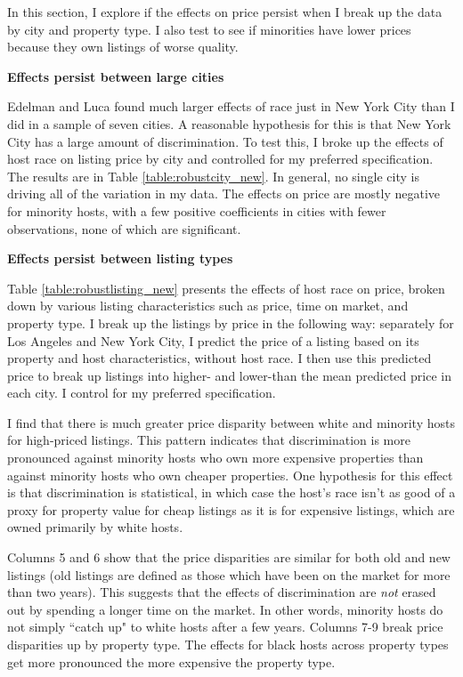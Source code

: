
In this section, I explore if the effects on price persist when I break up the data by city and property type. I also test to see if minorities have lower prices because they own listings of worse quality. 

\textbf{Effects persist between large cities}

Edelman and Luca found much larger effects of race just in New York City than I did in a sample of seven cities. A reasonable hypothesis for this is that New York City has a large amount of discrimination. To test this, I broke up the effects of host race on listing price by city and controlled for my preferred specification. The results are in Table \ref{table:robustcity_new}. In general, no single city is driving all of the variation in my data. The effects on price are mostly negative for minority hosts, with a few positive coefficients in cities with fewer observations, none of which are significant. 


\textbf{Effects persist between listing types}

Table \ref{table:robustlisting_new} presents the effects of host race on price, broken down by various listing characteristics such as price, time on market, and property type. I break up the listings by price in the following way: separately for Los Angeles and New York City, I predict the price of a listing based on its property and host characteristics, without host race. I then use this predicted price to break up listings into higher- and lower-than the mean predicted price in each city. I control for my preferred specification.  

I find that there is much greater price disparity between white and minority hosts for high-priced listings. This pattern indicates that discrimination is more pronounced against minority hosts who own more expensive properties than against minority hosts who own cheaper properties. One hypothesis for this effect is that discrimination is statistical, in which case the host's race isn't as good of a proxy for property value for cheap listings as it is for expensive listings, which are owned primarily by white hosts. 

Columns 5 and 6 show that the price disparities are similar for both old and new listings (old listings are defined as those which have been on the market for more than two years). This suggests that the effects of discrimination are \textit{not} erased out by spending a longer time on the market. In other words, minority hosts do not simply ``catch up" to white hosts after a few years. Columns 7-9 break price disparities up by property type. The effects for black hosts across property types get more pronounced the more expensive the property type. 


